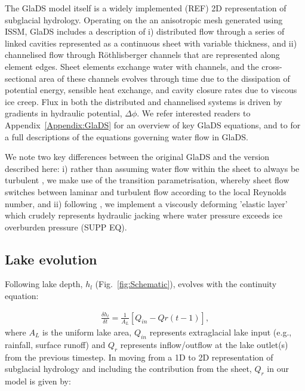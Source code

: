\documentclass[review,jog]{igs}
\begin{document}
The GlaDS model itself is a widely implemented (REF) 2D representation of subglacial hydrology. Operating on the an anisotropic mesh generated using ISSM, GlaDS includes a description of i) distributed flow through a series of linked cavities represented as a continuous sheet with variable thickness, and ii) channelised flow through Röthlisberger channels that are represented along element edges. Sheet elements exchange water with channels, and the cross-sectional area of these channels evolves through time due to the dissipation of potential energy, sensible heat exchange, and cavity closure rates due to viscous ice creep. Flux in both the distributed and channelised systems is driven by gradients in hydraulic potential, $\Delta \phi$. We refer interested readers to Appendix~\ref{Appendix:GlaDS} for an overview of key GlaDS equations, and to \cite{werder2013modeling} for a full descriptions of the equations governing water flow in GlaDS.

We note two key differences between the original GlaDS and the version described here: i) rather than assuming water flow within the sheet to always be turbulent \citep[cf:][]{werder2013modeling}, we make use of the \cite{hill2024improved} transition parametrisation, whereby sheet flow switches between laminar and turbulent flow according to the local Reynolds number, and ii) following \cite{Stevens2022}, we implement a viscously deforming 'elastic layer' which crudely represents hydraulic jacking where water pressure exceeds ice overburden pressure (SUPP EQ). 

\subsection{Lake evolution}\label{methods:Lake}

Following \cite{kingslake2013modelling} lake depth, $h_{l}$ (Fig.~\ref{fig:Schematic}), evolves with the continuity equation:

\begin{equation}
\label{eq:lakecontinuity}
\begin{aligned}
\frac{\delta h_{l}}{\delta t} = \frac{1}{A_{L}}[Q_{in}-Q{r}(t-1)],
\end{aligned}
\end{equation}
\noindent
where $A_L$ is the uniform lake area, $Q_{in}$ represents extraglacial lake input (e.g., rainfall, surface runoff) and $Q_{r}$ represents inflow/outflow at the lake outlet(s) from the previous timestep. In moving from a 1D to 2D representation of subglacial hydrology and including the contribution from the sheet, $Q_{r}$ in our model is given by:
\end{document}

